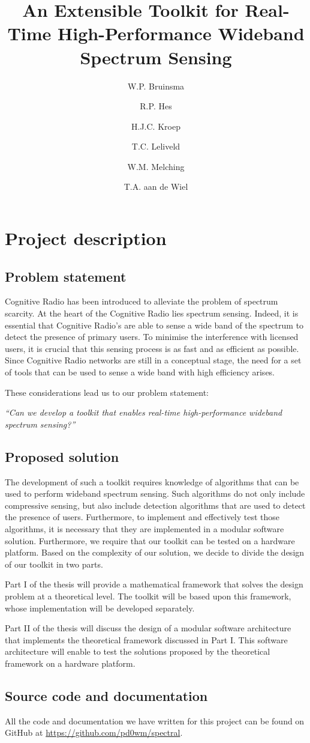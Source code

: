 \documentclass[a4paper, openany, oneside]{memoir}
\title{An Extensible Toolkit for Real-Time High-Performance Wideband Spectrum Sensing}
\author{W.P. Bruinsma \and R.P. Hes \and H.J.C. Kroep \and T.C. Leliveld \and W.M. Melching \and T.A. aan de Wiel}
\begin{document}
\chapter{Project description} \label{cha:problem_statement}
\section{Problem statement}

Cognitive Radio has been introduced to alleviate the problem of spectrum scarcity.
At the heart of the Cognitive Radio lies spectrum sensing. Indeed, it is essential that Cognitive Radio's are able to sense a wide band of the spectrum to detect the presence of primary users. To minimise the interference with licensed users, it is crucial that this sensing process is as fast and as efficient as possible. Since Cognitive Radio networks are still in a conceptual stage, the need for a set of tools that can be used to sense a wide band with high efficiency arises.

These considerations lead us to our problem statement:
\begin{center}
\emph{``Can we develop a toolkit that enables real-time high-performance wideband spectrum sensing?''}
\end{center}

\section{Proposed solution}
The development of such a toolkit requires knowledge of algorithms that can be used to perform wideband spectrum sensing. Such algorithms do not only include compressive sensing, but also include detection algorithms that are used to detect the presence of users. Furthermore, to implement and effectively test those algorithms, it is necessary that they are implemented in a modular software solution. Furthermore, we require that our toolkit can be tested on a hardware platform. Based on the complexity of our solution, we decide to divide the design of our toolkit in two parts.

Part I of the thesis will provide a mathematical framework that solves the design problem at a theoretical level. The toolkit will be based upon this framework, whose implementation will be developed separately.

Part II of the thesis will discuss the design of a modular software architecture that  implements the theoretical framework discussed in Part I. This software architecture will enable to test the solutions proposed by the theoretical framework on a hardware platform.

\section{Source code and documentation}
All the code and documentation we have written for this project can be found on GitHub at \url{https://github.com/pd0wm/spectral}.
\end{document}
